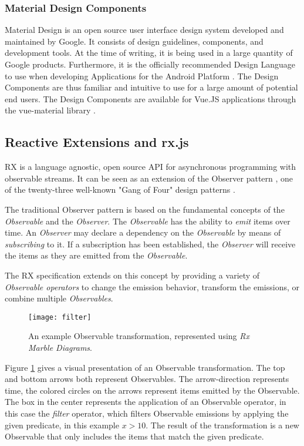 \subsubsection{Material Design Components}
Material Design is an open source user interface design system developed and maintained by Google. It consists of design guidelines, components, and development tools. At the time of writing, it is being used in a large quantity of Google products. Furthermore, it is the officially recommended Design Language to use when developing Applications for the Android Platform \cite{AndroidAppQualityGuidelines}. The Design Components are thus familiar and intuitive to use for a large amount of potential end users. The Design Components are available for Vue.JS applications through the vue-material library \cite{VueMaterial}.
\subsection{Reactive Extensions and rx.js}
\gls{RX} is a language agnostic, open source API for asynchronous programming with observable streams. It can be seen as an extension of the Observer pattern \cite{ReactiveXManual}, one of the twenty-three well-known "Gang of Four" design patterns \cite{Gamma:1995:DPE:186897}.

The traditional Observer pattern is based on the fundamental concepts of the \emph{Observable} and the \emph{Observer}. The \emph{Observable} has the ability to \emph{emit} items over time. An \emph{Observer} may declare a dependency on the \emph{Observable} by means of \emph{subscribing} to it. If a subscription has been established, the \emph{Observer} will receive the items as they are emitted from the \emph{Observable}.

The \gls{RX} specification extends on this concept by providing a variety of \emph{Observable operators} to change the emission behavior, transform the emissions, or combine multiple \emph{Observables}.

\begin{figure}[h]
    \centering
    \texttt{[image: filter]}
    \caption{An example Observable transformation, represented using \emph{Rx Marble Diagrams}.}
    \label{fig:rx-marbles-filter}
\end{figure}
%
Figure \ref{fig:rx-marbles-filter} gives a visual presentation of an Observable transformation. The top and bottom arrows both represent Observables. The arrow-direction represents time, the colored circles on the arrows represent items emitted by the Observable. The box in the center represents the application of an Observable operator, in this case the \emph{filter} operator, which filters Observable emissions by applying the given predicate, in this example $x > 10$. The result of the transformation is a new Observable that only includes the items that match the given predicate.

